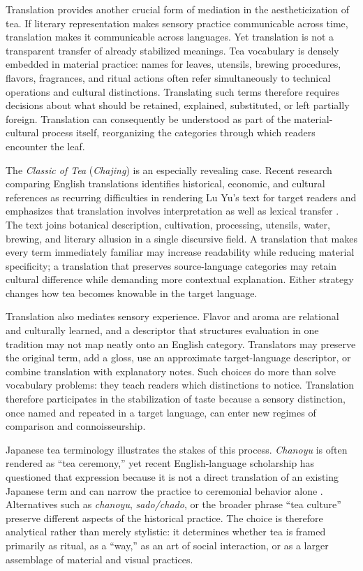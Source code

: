 \documentclass[numbers]{IntechOpen-Book}
\begin{document}
Translation provides another crucial form of mediation in the aestheticization of tea. If literary representation makes sensory practice communicable across time, translation makes it communicable across languages. Yet translation is not a transparent transfer of already stabilized meanings. Tea vocabulary is densely embedded in material practice: names for leaves, utensils, brewing procedures, flavors, fragrances, and ritual actions often refer simultaneously to technical operations and cultural distinctions. Translating such terms therefore requires decisions about what should be retained, explained, substituted, or left partially foreign. Translation can consequently be understood as part of the material-cultural process itself, reorganizing the categories through which readers encounter the leaf.

The \textit{Classic of Tea} (\textit{Chajing}) is an especially revealing case. Recent research comparing English translations identifies historical, economic, and cultural references as recurring difficulties in rendering Lu Yu's text for target readers and emphasizes that translation involves interpretation as well as lexical transfer \cite{leipenghan}. The text joins botanical description, cultivation, processing, utensils, water, brewing, and literary allusion in a single discursive field. A translation that makes every term immediately familiar may increase readability while reducing material specificity; a translation that preserves source-language categories may retain cultural difference while demanding more contextual explanation. Either strategy changes how tea becomes knowable in the target language.

Translation also mediates sensory experience. Flavor and aroma are relational and culturally learned, and a descriptor that structures evaluation in one tradition may not map neatly onto an English category. Translators may preserve the original term, add a gloss, use an approximate target-language descriptor, or combine translation with explanatory notes. Such choices do more than solve vocabulary problems: they teach readers which distinctions to notice. Translation therefore participates in the stabilization of taste because a sensory distinction, once named and repeated in a target language, can enter new regimes of comparison and connoisseurship.

Japanese tea terminology illustrates the stakes of this process. \textit{Chanoyu} is often rendered as ``tea ceremony,'' yet recent English-language scholarship has questioned that expression because it is not a direct translation of an existing Japanese term and can narrow the practice to ceremonial behavior alone \cite{corbett}. Alternatives such as \textit{chanoyu}, \textit{sado/chado}, or the broader phrase ``tea culture'' preserve different aspects of the historical practice. The choice is therefore analytical rather than merely stylistic: it determines whether tea is framed primarily as ritual, as a ``way,'' as an art of social interaction, or as a larger assemblage of material and visual practices.
\end{document}
